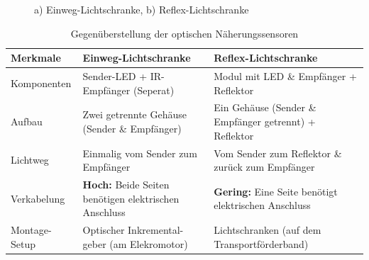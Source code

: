 {\begin{center}
\begin{figure}

\caption{a) Einweg-Lichtschranke, b) Reflex-Lichtschranke}
	\end{figure}
	\end{center}

	
\begin{table}
	\caption{Gegenüberstellung der optischen Näherungssensoren}
	\begin{center}
			\begin{tabular}{|p{}|p{3,8cm}|p{}|}
				
				\hline
				Merkmale & Einweg-Lichtschranke & Reflex-Lichtschranke \\
				\hline  
				
				Komponenten
				& Sender-LED + IR-Empfänger (Seperat)
				& Modul mit LED \& Empfänger + Reflektor\\
				\hline
				Aufbau
				& Zwei getrennte Gehäuse (Sender \& Empfänger)
				& Ein Gehäuse (Sender \& Empfänger getrennt) + Reflektor\\
				\hline
				Lichtweg
				& Einmalig vom Sender zum Empfänger
				& Vom Sender zum Reflektor \& zurück zum Empfänger\\
				\hline
				Verkabelung 
				& \textbf{Hoch:} Beide Seiten benötigen elektrischen Anschluss
				& \textbf{Gering:} Eine Seite benötigt elektrischen Anschluss\\
				\hline
				Montage-Setup
				& Optischer Inkremental-geber (am Elekromotor)
				& Lichtschranken (auf dem Transportförderband)\\
				\hline
					
				\end{tabular}
		\end{center}
	\end{table}
}

